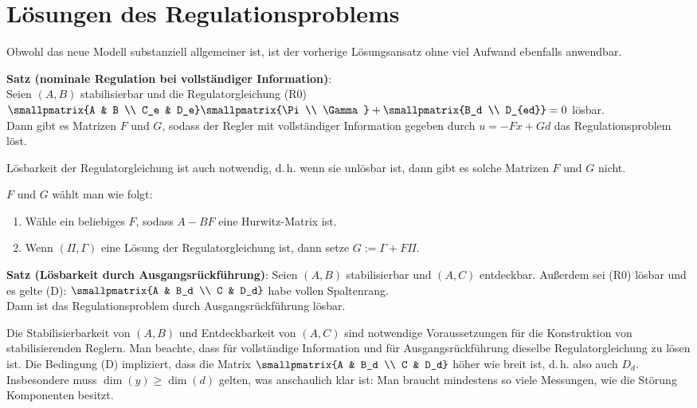 \pagebreak

\section{%
    Lösungen des Regulationsproblems%
}

Obwohl das neue Modell substanziell allgemeiner ist, ist der vorherige Lösungsansatz ohne viel
Aufwand ebenfalls anwendbar.

\textbf{Satz (nominale Regulation bei vollständiger Information)}:\\
Seien $(A, B)$ stabilisierbar und die Regulatorgleichung (R0)
$\smallpmatrix{A & B \\ C_e & D_e} \smallpmatrix{\Pi \\ \Gamma} +
\smallpmatrix{B_d \\ D_{ed}} = 0$
lösbar.\\
Dann gibt es Matrizen $F$ und $G$, sodass der Regler mit vollständiger
Information gegeben durch $u = -Fx + Gd$ das Regulationsproblem löst.

Lösbarkeit der Regulatorgleichung ist auch notwendig, d.\,h. wenn sie unlösbar ist,
dann gibt es solche Matrizen $F$ und $G$ nicht.

$F$ und $G$ wählt man wie folgt:
\begin{enumerate}
    \item
    Wähle ein beliebiges $F$, sodass $A - BF$ eine Hurwitz-Matrix ist.

    \item
    Wenn $(\Pi, \Gamma)$ eine Lösung der Regulatorgleichung ist,
    dann setze $G := \Gamma + F\Pi$.
\end{enumerate}

\linie

\textbf{Satz (Lösbarkeit durch Ausgangsrückführung)}:
Seien $(A, B)$ stabilisierbar und $(A, C)$ entdeckbar.
Außerdem sei (R0) lösbar und es gelte (D): $\smallpmatrix{A & B_d \\ C & D_d}$ habe vollen
Spaltenrang.\\
Dann ist das Regulationsproblem durch Ausgangsrückführung lösbar.

Die Stabilisierbarkeit von $(A, B)$ und Entdeckbarkeit von $(A, C)$ sind notwendige Voraussetzungen
für die Konstruktion von stabilisierenden Reglern.
Man beachte, dass für vollständige Information und für Ausgangsrückführung dieselbe
Regulatorgleichung zu lösen ist.
Die Bedingung (D) impliziert, dass die Matrix $\smallpmatrix{A & B_d \\ C & D_d}$ höher wie
breit ist, d.\,h. also auch $D_d$.
Insbesondere muss $\dim(y) \ge \dim(d)$ gelten, was anschaulich klar ist:
Man braucht mindestens so viele Messungen, wie die Störung Komponenten besitzt.

